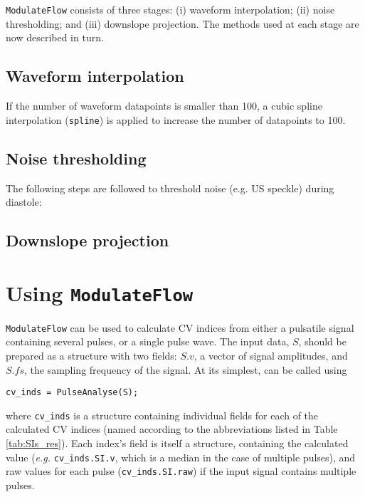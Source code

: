 \documentclass[12pt]{iopart}
\newcommand{\eg}{\textit{e.g.} }
\newcommand{\mf}{\texttt{ModulateFlow}}
\newcommand{\us}{\texttt{\_}}
\begin{document}
\mf{} consists of three stages: (i) waveform interpolation; (ii) noise thresholding; and (iii) downslope projection. The methods used at each stage are now described in turn.

\subsection{Waveform interpolation}

If the number of waveform datapoints is smaller than 100, a cubic spline interpolation (\texttt{spline}) is applied to increase the number of datapoints to 100. 

\subsection{Noise thresholding}

The following steps are followed to threshold noise (e.g. US speckle) during diastole:

\subsection{Downslope projection}







\section{Using \mf}

\mf{} can be used to calculate CV indices from either a pulsatile signal containing several pulses, or a single pulse wave. The input data, $S$, should be prepared as a structure with two fields: $S.v$, a vector of signal amplitudes, and $S.fs$, the sampling frequency of the signal. At its simplest, \pa can be called using
\begin{center}
	\texttt{cv\us inds = PulseAnalyse(S);}
\end{center}
where \texttt{cv\us inds} is a structure containing individual fields for each of the calculated CV indices (named according to the abbreviations listed in Table \ref{tab:SIs_res}). Each index's field is itself a structure, containing the calculated value (\eg{} \texttt{cv\us inds.SI.v}, which is a median in the case of multiple pulses), and raw values for each pulse (\texttt{cv\us inds.SI.raw}) if the input signal contains multiple pulses.
\end{document}
